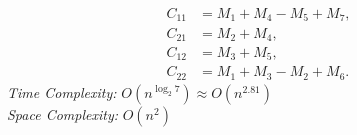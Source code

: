 {{\begin{enumerate}[noitemsep]
\begin{minipage}[t]{0.45\textwidth}
        \[
        \begin{aligned}
        C_{11} &= M_1 + M_4 - M_5 + M_7, \\
        C_{21} &= M_2 + M_4, \\
        C_{12} &= M_3 + M_5, \\
        C_{22} &= M_1 + M_3 - M_2 + M_6.
        \end{aligned}
        \]
            \textit{Time Complexity:} \(O(n^{\log_2 7}) \approx O(n^{2.81})\)\\
    \textit{Space Complexity:} \(O(n^2)\)
        \end{minipage}
    \end{enumerate}
    \vspace{0.5ex}
    \justifying
}} 